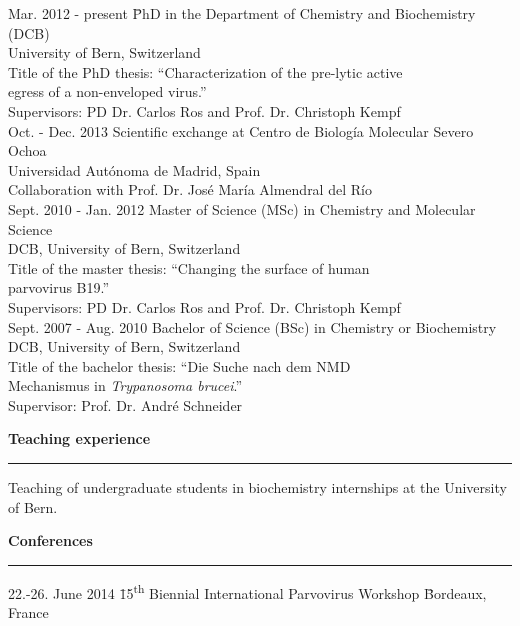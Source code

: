 \normalsize
\vspace{-0.7cm}
\begin{tabbing}
Mar. 2012 - present \hspace*{0.9cm} \= PhD in the Department of Chemistry and Biochemistry (DCB) \\ 
\> University of Bern, Switzerland  \\
\> Title of the PhD thesis: ``Characterization of the pre-lytic active \\ 
\> egress of a non-enveloped virus.'' \\
\> Supervisors: PD Dr. Carlos Ros and Prof. Dr. Christoph Kempf \\ [0.3cm]
Oct. - Dec. 2013 \> Scientific exchange at Centro de Biología Molecular Severo Ochoa \\
\> Universidad Autónoma de Madrid, Spain \\
\> Collaboration with Prof. Dr. José María Almendral del Río \\ [0.3cm]
Sept. 2010 - Jan. 2012 \> Master of Science (MSc) in Chemistry and Molecular Science \\
\> DCB, University of Bern, Switzerland  \\
\> Title of the master thesis: ``Changing the surface of human \\ \> parvovirus B19.'' \\
\> Supervisors: PD Dr. Carlos Ros and Prof. Dr. Christoph Kempf \\ [0.3cm]
Sept. 2007 - Aug. 2010 \> Bachelor of Science (BSc) in Chemistry or Biochemistry \\
\> DCB, University of Bern, Switzerland  \\
\> Title of the bachelor thesis: ``Die Suche nach dem NMD \\
\> Mechanismus in \textit{Trypanosoma brucei}.'' \\
\> Supervisor: Prof. Dr. André Schneider
\end{tabbing}

\vspace{0.2 cm}
\large
\textbf{Teaching experience}
\noindent\rule[3mm]{\linewidth}{1pt}

\normalsize
\vspace{-0.2cm}
Teaching of undergraduate students in biochemistry internships at the University of Bern.

\vspace{0.475 cm}
\large
\textbf{Conferences}
\noindent\rule[3mm]{\linewidth}{1pt}

\normalsize
\vspace{-0.6 cm}
\begin{tabbing}
22.-26. June 2014 \hspace{1.27 cm} \= 15\textsuperscript{th} Biennial International Parvovirus Workshop \hspace{0.1 cm} \= Bordeaux, France
\end{tabbing}



